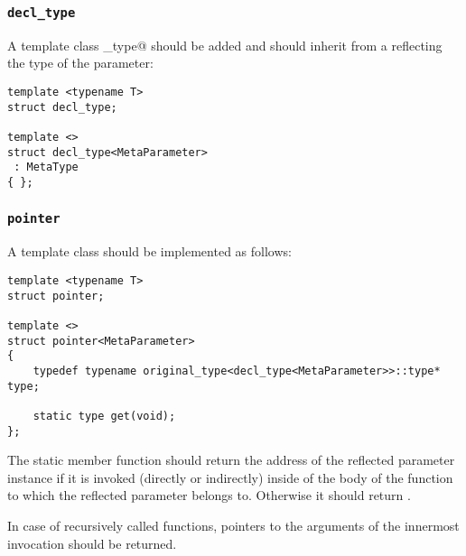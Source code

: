 \subsubsection{\texttt{decl\_type}}

A template class \verb@decl_type@ should be added and should inherit
from a  reflecting the type of the parameter:

\begin{verbatim}
template <typename T>
struct decl_type;

template <>
struct decl_type<MetaParameter>
 : MetaType
{ };
\end{verbatim}

\subsubsection{\texttt{pointer}}

A template class \verb@pointer@ should be implemented as follows:

\begin{verbatim}
template <typename T>
struct pointer;

template <>
struct pointer<MetaParameter>
{
	typedef typename original_type<decl_type<MetaParameter>>::type* type;

	static type get(void);
};
\end{verbatim}

The static member function \verb@get@ should return the address of the reflected parameter
instance if it is invoked (directly or indirectly) inside of the body of the function to which
the reflected parameter belongs to. Otherwise it should return \verb@nullptr@.

In case of recursively called functions, pointers to the arguments of the innermost
invocation should be returned.
